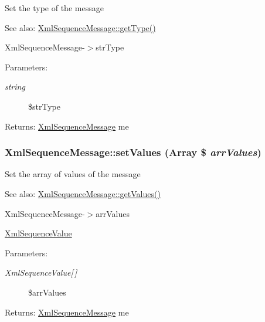 Set the type of the message

\begin{Desc}
\item[See also:]\hyperlink{class_xml_sequence_message_d839c7bfe476a42ddf264d019a13938b}{XmlSequenceMessage::getType()} 

XmlSequenceMessage-$>$strType \end{Desc}
\begin{Desc}
\item[Parameters:]
\begin{description}
\item[{\em string}]\$strType \end{description}
\end{Desc}
\begin{Desc}
\item[Returns:]\hyperlink{class_xml_sequence_message}{XmlSequenceMessage} me \end{Desc}
\hypertarget{class_xml_sequence_message_4ed3a9eceec6ce84566098813fde6101}{
\subsubsection[{setValues}]{\setlength{\rightskip}{0pt plus 5cm}XmlSequenceMessage::setValues (Array \$ {\em arrValues})}}
\label{class_xml_sequence_message_4ed3a9eceec6ce84566098813fde6101}


Set the array of values of the message

\begin{Desc}
\item[See also:]\hyperlink{class_xml_sequence_message_9c2e8f8d995477aad79640ad673ab6a9}{XmlSequenceMessage::getValues()} 

XmlSequenceMessage-$>$arrValues 

\hyperlink{class_xml_sequence_value}{XmlSequenceValue} \end{Desc}
\begin{Desc}
\item[Parameters:]
\begin{description}
\item[{\em XmlSequenceValue\mbox{[}$\,$\mbox{]}}]\$arrValues \end{description}
\end{Desc}
\begin{Desc}
\item[Returns:]\hyperlink{class_xml_sequence_message}{XmlSequenceMessage} me \end{Desc}


